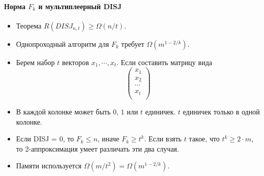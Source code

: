 
\paragraph{Норма $F_k$ и мультиплеерный DISJ} %
\label{par:f_k_disj}

\begin{itemize}
	\item Теорема $R(DISJ_{n, t}) \geq \Omega(n \slash t)$.
	\item Однопроходный алгоритм для $F_k$ требует $\Omega(m^{1 - 2 \slash k})$.
	\item Берем набор $t$ векторов $x_1, \cdots, x_t$. Если составить матрицу вида
	$$
	\left(
	\begin{array}{c}
		x_1 \\
		x_2 \\
		\cdots \\
		x_t \\
	\end{array}
	\right)
	$$
	\item В каждой колонке может быть $0$, $1$ или $t$ единичек. $t$ единичек только в одной колонке.
	\item Если DISJ = 0, то $F_k \leq n$, иначе $F_k \geq t^k$. Если взять $t$ такое, что $t^k \geq 2 \cdot m$,
	то 2-аппроксимация умеет различать эти два случая.
	\item Памяти используется $\Omega(m \slash t^2) = \Omega(m^{1 - 2 \slash k})$.
\end{itemize}


